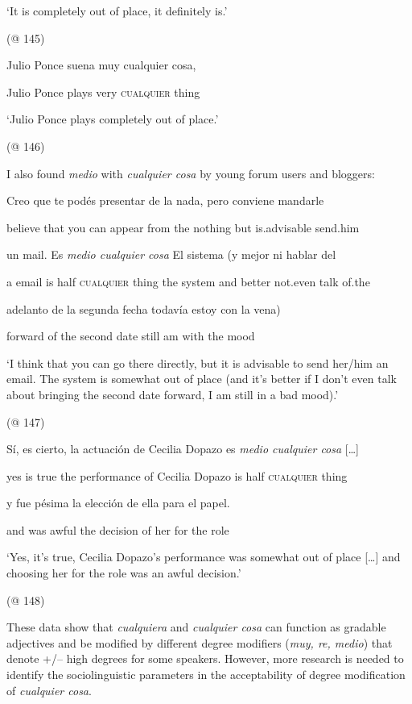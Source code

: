     ‘It is completely out of place, it definitely is.’

    (@ 145)

    Julio Ponce  suena  muy  cualquier  cosa,

    Julio Ponce  plays  very  \textsc{cualquier}  thing

    ‘Julio Ponce plays completely out of place.’

    (@ 146)

I also found \textit{medio} with \textit{cualquier cosa} by young forum users and bloggers:

    Creo  que  te  podés  presentar  de  la  nada,  pero  conviene  mandarle

    believe  that  you  can  appear  from  the  nothing  but  is.advisable  send.him

    un  mail.  Es  \textit{medio  cualquier  cosa} El  sistema  (y  mejor  ni  hablar  del

    a  email  is  half  \textsc{cualquier}  thing  the  system  and  better  not.even  talk  of.the

    adelanto  de  la  segunda  fecha  todavía  estoy  con  la  vena)

    forward  of  the  second  date  still  am  with  the  mood

    ‘I think that you can go there directly, but it is advisable to send her/him an email. The system is somewhat out of place (and it’s better if I don’t even talk about bringing the second date forward, I am still in a bad mood).’

    (@ 147)

    Sí,  es  cierto,  la  actuación  de  Cecilia  Dopazo  es  \textit{medio  cualquier  cosa} […]

    yes  is  true  the  performance  of  Cecilia  Dopazo  is  half  \textsc{cualquier}  thing  

    y  fue  pésima  la  elección  de  ella  para  el  papel.

    and  was  awful  the  decision  of  her  for  the  role

    ‘Yes, it’s true, Cecilia Dopazo’s performance was somewhat out of place […] and choosing her for the role was an awful decision.’

    (@ 148)

These data show that \textit{cualquiera} and \textit{cualquier cosa} can function as gradable adjectives and be modified by different degree modifiers (\textit{muy, re, medio}) that denote +/– high degrees for some speakers. However, more research is needed to identify the sociolinguistic parameters in the acceptability of degree modification of \textit{cualquier cosa}. 

